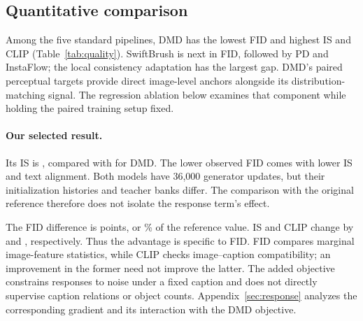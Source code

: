 \documentclass[10pt,twocolumn,letterpaper]{article}
\begin{document}
\subsection{Quantitative comparison}
\begin{table}[t]
\centering\small

\caption{\textbf{Full-validation quality including Ours.} Every score uses
all 5,000 COCO validation images. Bold marks the best student value for each
metric; the teacher is a reference with a larger inference budget. All
student generators have rank 32 and 36,000 updates. Ours is trained
independently with two phase-specific teacher banks; the original DMD
reference uses its earlier training setup.}
\label{tab:quality}
\end{table}
Among the five standard pipelines, DMD has the lowest FID and highest IS and
CLIP (Table~\ref{tab:quality}). SwiftBrush is next in FID, followed by PD and
InstaFlow; the local consistency adaptation has the largest gap. DMD's
paired perceptual targets provide direct image-level anchors alongside its
distribution-matching signal. The regression ablation below examines that
component while holding the paired training setup fixed.

\paragraph{Our selected result.}

Its IS is \ASelectedIS{}, compared with \AReferenceIS{} for DMD. The lower
observed FID comes with lower IS and text alignment. Both models have
36,000 generator updates, but their initialization histories and teacher
banks differ. \AIndependentControlStatus{}
The comparison with the original reference therefore does not isolate the
response term's effect.

The FID difference is \ASelectedFIDGain{} points, or
\ASelectedFIDGainPercent{}\% of the reference value. IS and CLIP change by
\ASelectedISChange{} and \ASelectedCLIPChange{}, respectively. Thus the
advantage is specific to FID. FID compares marginal image-feature
statistics, while CLIP checks image--caption compatibility; an improvement
in the former need not improve the latter. The added objective constrains
responses to noise under a fixed caption and does not directly supervise
caption relations or object counts. Appendix~\ref{sec:response} analyzes
the corresponding gradient and its interaction with the DMD objective.
\end{document}
